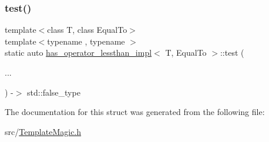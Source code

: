 \mbox{\label{structhas__operator__lessthan__impl_ae64af96a16053f6ded781dda66fc5fb1}} 
\subsubsection{\texorpdfstring{test()}{test()}\hspace{0.1cm}{\footnotesize\ttfamily [2/2]}}
{\footnotesize\ttfamily template$<$class T, class Equal\+To$>$ \\
template$<$typename , typename $>$ \\
static auto \hyperlink{structhas__operator__lessthan__impl}{has\+\_\+operator\+\_\+lessthan\+\_\+impl}$<$ T, Equal\+To $>$\+::test (\begin{DoxyParamCaption}\item[{}]{... }\end{DoxyParamCaption}) -\/$>$  std\+::false\+\_\+type\hspace{0.3cm}{\ttfamily [static]}}



The documentation for this struct was generated from the following file\+:\begin{DoxyCompactItemize}
\item 
src/\hyperlink{_template_magic_8h}{Template\+Magic.\+h}\end{DoxyCompactItemize}
